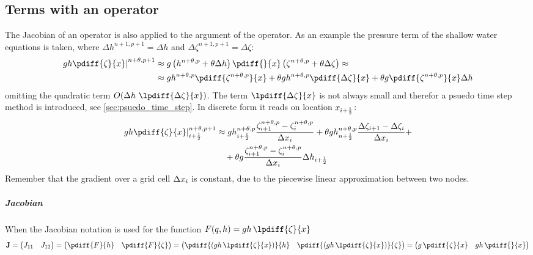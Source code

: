 \subsection{Terms with an operator}\label{sec:jacobians_with_operator}
The Jacobian of an operator is also applied to the argument of the operator.
As an example the pressure term of the shallow water equations is taken, where $\Delta h^{n+1, p+1} = \Delta h$ and  $\Delta \zeta^{n+1, p+1} = \Delta \zeta$:
\begin{align}
    \left. gh \pdiff{\zeta}{x}\right|^{n+\theta, p+1} & \approx g \left( h^{n+\theta, p} + \theta \Delta h \right) \pdiff{}{x} \left( \zeta^{n+\theta, p} + \theta\Delta \zeta  \right) \approx
    \\
    & \approx g h^{n+\theta, p} \pdiff{\zeta^{n+\theta, p}}{x} + \theta gh^{n+\theta, p} \pdiff{\Delta \zeta}{x} + \theta g \pdiff{\zeta^{n+\theta, p}}{x} \Delta h
\end{align}
omitting the quadratic  term $O(\Delta h\ \lpdiff{\Delta \zeta}{x})$.
The term  $\lpdiff{\Delta \zeta}{x}$ is not always small and therefor a psuedo time step method is introduced, see \autoref{sec:psuedo_time_step}.
In discrete form it reads on location $x_{i+\frac{1}{2}}$:
\begin{align}
    \left. gh \pdiff{\zeta}{x}\right|^{n+\theta, p+1}_{i+\half} & \approx g h^{n+\theta, p}_{i+\half} \frac{\zeta^{n+\theta, p}_{i+1} - \zeta^{n+\theta, p}_{i}}{\Dx_{i}}
    + \theta gh^{n+\theta, p}_{n+\half} \frac{\Delta \zeta_{i+1} - \Delta \zeta_{i}}{\Dx_{i}} +
    \\
    & \quad
    + \theta g \frac{\zeta^{n+\theta, p}_{i+1} - \zeta^{n+\theta, p}_{i}}{\Dx_{i}} \Delta h_{i+\half}
\end{align}
Remember that the gradient over a grid cell $\Delta x_i$ is constant, due to the piecewise linear approximation between two nodes.
\subparagraph*{Jacobian}
When the Jacobian notation is  used for the function $F(q,h) = gh\, \lpdiff{\zeta}{x}$
\begin{align}
    \mat{J} =
    \begin{pmatrix}
        J_{11} & J_{12}
    \end{pmatrix}
    =
    \begin{pmatrix}
        \pdiff{F}{h} & \pdiff{F}{\zeta}
    \end{pmatrix}
    =
    \begin{pmatrix}
        \pdiff{(gh\, \lpdiff{\zeta}{x})}{h} & \pdiff{(gh\, \lpdiff{\zeta}{x})}{\zeta}
    \end{pmatrix}
    =
    \begin{pmatrix}
        g\, \pdiff{\zeta}{x} & gh\, \pdiff{}{x}
    \end{pmatrix}
\end{align}
